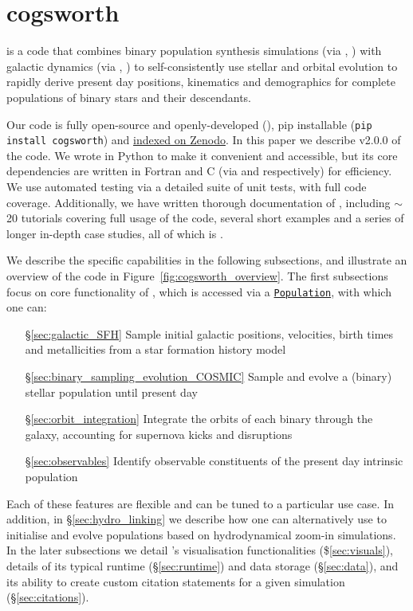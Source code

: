 \documentclass[twocolumn, twocolappendix, oneside]{aastex631}
\newcommand{\codeLink}[2]{{\href{https://cogsworth.readthedocs.io/en/latest/api/cogsworth.#2.#1.html}{\color{codecolour} \texttt{#1}}}}
\begin{document}
\section{cogsworth}\label{sec:cogsworth}

\cogsworth is a code that combines binary population synthesis simulations (via \cosmic, \citealp{COSMIC}) with galactic dynamics (via \gala, \citealp{Gala}) to self-consistently use stellar and orbital evolution to rapidly derive present day positions, kinematics and demographics for complete populations of binary stars and their descendants. 

Our code is fully open-source and openly-developed (), pip installable (\texttt{pip install cogsworth}) and \href{https://zenodo.org/records/13709381}{indexed on Zenodo}. In this paper we describe v2.0.0 of the code. We wrote \cogsworth in Python to make it convenient and accessible, but its core dependencies are written in Fortran and C (via \cosmic and \gala respectively) for efficiency. We use automated testing via a detailed suite of unit tests, with full code coverage. Additionally, we have written thorough documentation of \cogsworth, including  $\sim$20 tutorials covering full usage of the code, several short examples and a series of longer in-depth case studies, all of which is .

We describe the specific capabilities in the following subsections, and illustrate an overview of the code in Figure~\ref{fig:cogsworth_overview}. The first subsections focus on core functionality of \cogsworth, which is accessed via a \codeLink{Population}{pop}, with which one can:

\begin{itemize}
    \item [\S\ref{sec:galactic_SFH}] Sample initial galactic positions, velocities, birth times and metallicities from a star formation history model
    \item [\S\ref{sec:binary_sampling_evolution_COSMIC}] Sample and evolve a (binary) stellar population until present day
    \item [\S\ref{sec:orbit_integration}] Integrate the orbits of each binary through the galaxy, accounting for supernova kicks and disruptions
    \item [\S\ref{sec:observables}] Identify observable constituents of the present day intrinsic population
\end{itemize}
Each of these features are flexible and can be tuned to a particular use case. In addition, in \S\ref{sec:hydro_linking} we describe how one can alternatively use \cogsworth to initialise and evolve populations based on hydrodynamical zoom-in simulations. In the later subsections we detail \cogsworth's visualisation functionalities (\$\ref{sec:visuals}), details of its typical runtime (\S\ref{sec:runtime}) and data storage (\S\ref{sec:data}), and its ability to create custom citation statements for a given simulation (\S\ref{sec:citations}).
\end{document}
